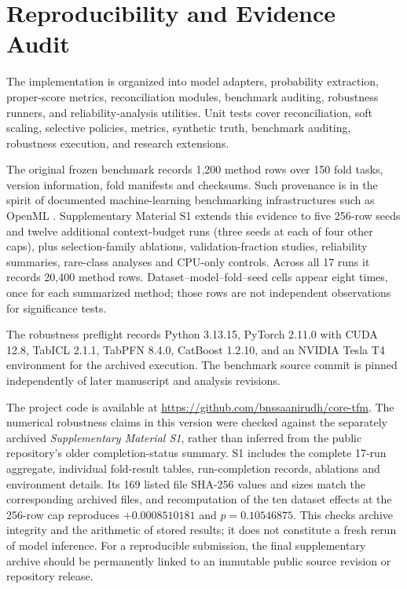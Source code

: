 \documentclass[a4paper,fleqn]{cas-sc}
\begin{document}
\section{Reproducibility and Evidence Audit}
The implementation is organized into model adapters, probability extraction, proper-score metrics, reconciliation modules, benchmark auditing, robustness runners, and reliability-analysis utilities. Unit tests cover reconciliation, soft scaling, selective policies, metrics, synthetic truth, benchmark auditing, robustness execution, and research extensions.

The original frozen benchmark records 1,200 method rows over 150 fold tasks, version information, fold manifests and checksums. Such provenance is in the spirit of documented machine-learning benchmarking infrastructures such as OpenML \citep{vanschoren2014openml}. Supplementary Material S1 extends this evidence to five 256-row seeds and twelve additional context-budget runs (three seeds at each of four other caps), plus selection-family ablations, validation-fraction studies, reliability summaries, rare-class analyses and CPU-only controls. Across all 17 runs it records 20,400 method rows. Dataset--model--fold--seed cells appear eight times, once for each summarized method; those rows are not independent observations for significance tests.

The robustness preflight records Python 3.13.15, PyTorch 2.11.0 with CUDA 12.8, TabICL 2.1.1, TabPFN 8.4.0, CatBoost 1.2.10, and an NVIDIA Tesla T4 environment for the archived execution. The benchmark source commit is pinned independently of later manuscript and analysis revisions.

The project code is available at \url{https://github.com/bnssaanirudh/core-tfm}. The numerical robustness claims in this version were checked against the separately archived \emph{Supplementary Material S1}, rather than inferred from the public repository's older completion-status summary. S1 includes the complete 17-run aggregate, individual fold-result tables, run-completion records, ablations and environment details. Its 169 listed file SHA-256 values and sizes match the corresponding archived files, and recomputation of the ten dataset effects at the 256-row cap reproduces $+0.0008510181$ and $p=0.10546875$. This checks archive integrity and the arithmetic of stored results; it does not constitute a fresh rerun of model inference. For a reproducible submission, the final supplementary archive should be permanently linked to an immutable public source revision or repository release.
\end{document}
